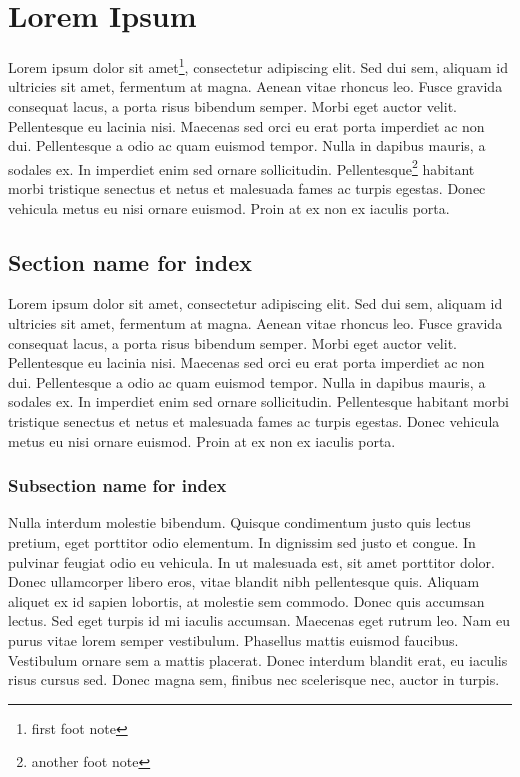 \chapter[Chapter name for Index]{Lorem Ipsum}
Lorem ipsum dolor sit amet\footnote{first foot note}, consectetur adipiscing elit. Sed dui sem, aliquam id ultricies sit amet, fermentum at magna. Aenean vitae rhoncus leo. Fusce gravida consequat lacus, a porta risus bibendum semper. Morbi eget auctor velit. Pellentesque eu lacinia nisi. Maecenas sed orci eu erat porta imperdiet ac non dui. Pellentesque a odio ac quam euismod tempor. Nulla in dapibus mauris, a sodales ex. In imperdiet enim sed ornare sollicitudin. Pellentesque\footnote{another foot note} habitant morbi tristique senectus et netus et malesuada fames ac turpis egestas. Donec vehicula metus eu nisi ornare euismod. Proin at ex non ex iaculis porta.

\section[Section name]{Section name for index}
Lorem ipsum dolor sit amet, consectetur adipiscing elit. Sed dui sem, aliquam id ultricies sit amet, fermentum at magna. Aenean vitae rhoncus leo. Fusce gravida consequat lacus, a porta risus bibendum semper. Morbi eget auctor velit. Pellentesque eu lacinia nisi. Maecenas sed orci eu erat porta imperdiet ac non dui. Pellentesque a odio ac quam euismod tempor. Nulla in dapibus mauris, a sodales ex. In imperdiet enim sed ornare sollicitudin. Pellentesque habitant morbi tristique senectus et netus et malesuada fames ac turpis egestas. Donec vehicula metus eu nisi ornare euismod. Proin at ex non ex iaculis porta.\cite{Williamson:Chemio}

\subsection[Subsection name]{Subsection name for index}
Nulla interdum molestie bibendum. Quisque condimentum justo quis lectus pretium, eget porttitor odio elementum. In dignissim sed justo et congue. In pulvinar feugiat odio eu vehicula. In ut malesuada est, sit amet porttitor dolor. Donec ullamcorper libero eros, vitae blandit nibh pellentesque quis. Aliquam aliquet ex id sapien lobortis, at molestie sem commodo. Donec quis accumsan lectus. Sed eget turpis id mi iaculis accumsan. Maecenas eget rutrum leo. Nam eu purus vitae lorem semper vestibulum. Phasellus mattis euismod faucibus. Vestibulum ornare sem a mattis placerat. Donec interdum blandit erat, eu iaculis risus cursus sed. Donec magna sem, finibus nec scelerisque nec, auctor in turpis.

